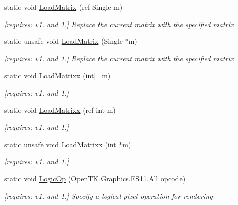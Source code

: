\begin{DoxyCompactItemize}
static void \hyperlink{class_open_t_k_1_1_graphics_1_1_e_s11_1_1_g_l_a1d91c3db9c6134d310cf13e1aa2f8a94}{Load\-Matrix} (ref Single m)
\begin{DoxyCompactList}\small\item\em \mbox{[}requires\-: v1. and 1.\mbox{]} Replace the current matrix with the specified matrix \end{DoxyCompactList}\item 
static unsafe void \hyperlink{class_open_t_k_1_1_graphics_1_1_e_s11_1_1_g_l_aae53f188335418f6d22cb1d27eba490d}{Load\-Matrix} (Single $\ast$m)
\begin{DoxyCompactList}\small\item\em \mbox{[}requires\-: v1. and 1.\mbox{]} Replace the current matrix with the specified matrix \end{DoxyCompactList}\item 
static void \hyperlink{class_open_t_k_1_1_graphics_1_1_e_s11_1_1_g_l_abe1a18aa52d16ab1fd2cfb3c7680ec52}{Load\-Matrixx} (int\mbox{[}$\,$\mbox{]} m)
\begin{DoxyCompactList}\small\item\em \mbox{[}requires\-: v1. and 1.\mbox{]}\end{DoxyCompactList}\item 
static void \hyperlink{class_open_t_k_1_1_graphics_1_1_e_s11_1_1_g_l_a90eabad018ae22e6204c318ceae01e6b}{Load\-Matrixx} (ref int m)
\begin{DoxyCompactList}\small\item\em \mbox{[}requires\-: v1. and 1.\mbox{]}\end{DoxyCompactList}\item 
static unsafe void \hyperlink{class_open_t_k_1_1_graphics_1_1_e_s11_1_1_g_l_ad13ac9444465a84d2a1953bc70f54001}{Load\-Matrixx} (int $\ast$m)
\begin{DoxyCompactList}\small\item\em \mbox{[}requires\-: v1. and 1.\mbox{]}\end{DoxyCompactList}\item 
static void \hyperlink{class_open_t_k_1_1_graphics_1_1_e_s11_1_1_g_l_adf77d61ce07276d93076d5dc605aa1c5}{Logic\-Op} (Open\-T\-K.\-Graphics.\-E\-S11.\-All opcode)
\begin{DoxyCompactList}\small\item\em \mbox{[}requires\-: v1. and 1.\mbox{]} Specify a logical pixel operation for rendering \end{DoxyCompactList}\item 

\end{DoxyCompactItemize}
